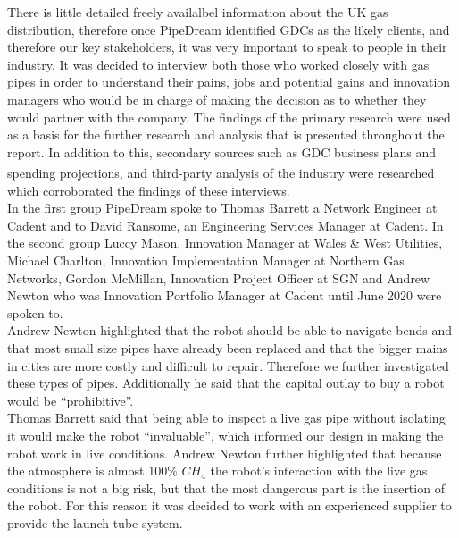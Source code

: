 \documentclass[11pt]{article}		%
\newcommand{\supercite}[1]{\textsuperscript{\cite{#1}}}		%
\begin{document}
            There is little detailed freely availalbel information about the UK gas distribution, therefore once PipeDream identified GDCs as the likely clients, and therefore our key stakeholders, it was very important to speak to people in their industry. It was decided to interview both those who worked closely with gas pipes in order to understand their pains, jobs and potential gains and innovation managers who would be in charge of making the decision as to whether they would partner with the company. The findings of the primary research were used as a basis for the further research and analysis that is presented throughout the report. In addition to this, secondary sources such as GDC business plans and spending projections\supercite{SGN-GD2}, and third-party analysis of the industry\supercite{Gas_Distribution_Industry} were researched which corroborated the findings of these interviews.
	        \\\hspace*{3ex}
	         In the first group PipeDream spoke to Thomas Barrett a Network Engineer at Cadent and to David Ransome, an Engineering Services Manager at Cadent. In the second group Luccy Mason, Innovation Manager at Wales \& West Utilities, Michael Charlton, Innovation Implementation Manager at Northern Gas Networks, Gordon McMillan, Innovation Project Officer at SGN and Andrew Newton who was Innovation Portfolio Manager at Cadent until June 2020 were spoken to.
	        \\\hspace*{3ex}
	        Andrew Newton highlighted that the robot should be able to navigate bends and that most small size pipes have already been replaced and that the bigger mains in cities are more costly and difficult to repair. Therefore we further investigated these types of pipes. Additionally he said that the capital outlay to buy a robot would be “prohibitive”. 
	        \\\hspace*{3ex}
	        Thomas Barrett said that being able to inspect a live gas pipe without isolating it would make the robot “invaluable”, which informed our design in making the robot work in live conditions. Andrew Newton further highlighted that because the atmosphere is almost 100\% ${CH}_4$ the robot’s interaction with the live gas conditions is not a big risk, but that the most dangerous part is the insertion of the robot. For this reason it was decided to work with an experienced supplier to provide the launch tube system.
	        \\\hspace*{3ex}
\end{document}
